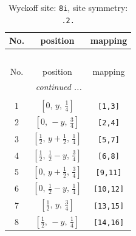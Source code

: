 \documentclass[fleqn,8pt]{jsarticle}
\begin{document}
\begin{longtable}{ccc}
\caption{Wyckoff site: {\tt 8i}, site symmetry: {\tt .2.}}
 \\
 \hline \hline
No. & position & mapping \\ \hline \endfirsthead

\multicolumn{2}{l}{\tablename\ \thetable{}} \\
 \hline \hline
No. & position & mapping \\ \hline \endhead

 \hline \hline
\multicolumn{2}{r}{\footnotesize\it continued ...} \\ \endfoot

 \hline \hline
\multicolumn{2}{r}{} \\ \endlastfoot

1 & $\left[ 0,\, y,\, \frac{1}{4} \right]$ & {\tt [1,3]} \\ \hline
2 & $\left[ 0,\, - y,\, \frac{3}{4} \right]$ & {\tt [2,4]} \\ \hline
3 & $\left[ \frac{1}{2},\, y + \frac{1}{2},\, \frac{1}{4} \right]$ & {\tt [5,7]} \\ \hline
4 & $\left[ \frac{1}{2},\, \frac{1}{2} - y,\, \frac{3}{4} \right]$ & {\tt [6,8]} \\ \hline
5 & $\left[ 0,\, y + \frac{1}{2},\, \frac{3}{4} \right]$ & {\tt [9,11]} \\ \hline
6 & $\left[ 0,\, \frac{1}{2} - y,\, \frac{1}{4} \right]$ & {\tt [10,12]} \\ \hline
7 & $\left[ \frac{1}{2},\, y,\, \frac{3}{4} \right]$ & {\tt [13,15]} \\ \hline
8 & $\left[ \frac{1}{2},\, - y,\, \frac{1}{4} \right]$ & {\tt [14,16]} \\
\end{longtable}
\renewcommand{\arraystretch}{1.2}
\end{document}
